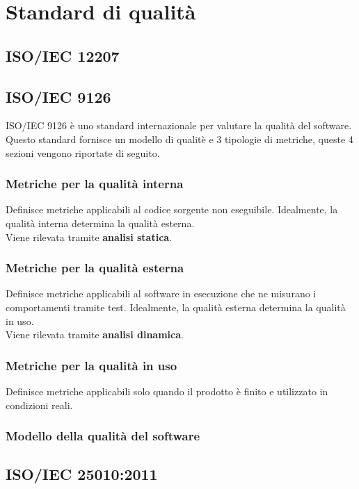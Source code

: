 \section{Standard di qualità}
\subsection{ISO/IEC 12207}
\subsection{ISO/IEC 9126}
ISO/IEC 9126 è uno standard internazionale per valutare la qualità del software.\\
Questo standard fornisce un modello di qualitè e 3 tipologie di metriche, queste 4 sezioni vengono riportate di seguito.
\subsubsection{Metriche per la qualità interna}
Definisce metriche applicabili al codice sorgente non eseguibile. Idealmente, la qualità interna determina la qualità esterna.\\
Viene rilevata tramite \textbf{analisi statica}.
\subsubsection{Metriche per la qualità esterna}
Definisce metriche applicabili al software in esecuzione che ne misurano i comportamenti tramite test. Idealmente, la qualità esterna determina la qualità in uso.\\
Viene rilevata tramite \textbf{analisi dinamica}.
\subsubsection{Metriche per la qualità in uso}
Definisce metriche applicabili solo quando il prodotto è finito e utilizzato in condizioni reali.
\subsubsection{Modello della qualità del software}
\subsection{ISO/IEC 25010:2011}